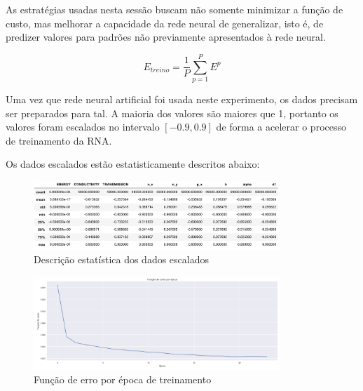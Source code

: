 
As estratégias usadas nesta sessão buscam não somente minimizar a função de custo, mas melhorar a capacidade da rede neural de generalizar, isto é, de predizer valores para padrões não previamente apresentados à rede neural.

$$E_{treino}=\frac{1}{P} \sum_{p=1}^P E^p$$ 

Uma vez que rede neural artificial foi usada neste experimento, os dados precisam ser preparados para tal.
A maioria dos valores são maiores que 1, portanto os valores foram escalados no intervalo $[-0.9, 0.9]$ de forma a acelerar o processo de treinamento da RNA.

Os dados escalados estão estatisticamente descritos abaixo:

\begin{figure}
    \centering
    \includegraphics[width=350px]{figuras/scaled_data_summary.png}
    \caption{Descrição estatística dos dados escalados}
    \label{fig:Scaled data summary}
\end{figure}

\begin{figure}
    \centering
    \includegraphics[width=350px]{figuras/erro_por_epoca.png}
    \caption{Função de erro por época de treinamento}
    \label{fig:Loss function per epoch}
\end{figure}


